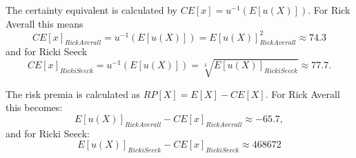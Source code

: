 \documentclass{article}
\begin{document}
	The certainty equivalent is calculated by $CE[x] = u^{-1}(E[u(X)])$. For Rick Averall this means
	\begin{equation}
		CE[x]_{Rick Averall} = u^{-1}(E[u(X)]) = E[u(X)]_{Rick Averall}^2 \approx 74.3
	\end{equation}
	and for Ricki Seeck 
		\begin{equation}
		CE[x]_{Ricki Seeck} = u^{-1}(E[u(X)]) = \sqrt[3]{E[u(X)]_{Ricki Seeck}} \approx 77.7.
	\end{equation}

	The risk premia is calculated as $RP[X] = E[X] - CE[X]$. 
	For Rick Averall this becomes:
	\begin{equation}
		E[u(X)]_{Rick Averall} - CE[x]_{Rick Averall} \approx -65.7,
	\end{equation}
	and for Ricki Seeck:
		\begin{equation}
		E[u(X)]_{Ricki Seeck} - CE[x]_{Ricki Seeck} \approx 468 672
	\end{equation}
\end{document}
